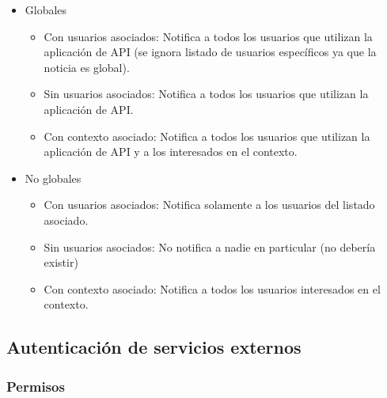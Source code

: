 \begin{itemize}
\item Globales
\begin{itemize}
\item Con usuarios asociados: Notifica a todos los usuarios que utilizan la aplicación de API (se ignora listado de usuarios específicos ya que la noticia es global).
\item Sin usuarios asociados: Notifica a todos los usuarios que utilizan la aplicación de API.
\item Con contexto asociado: Notifica a todos los usuarios que utilizan la aplicación de API y a los interesados en el contexto.
\end{itemize}
\item No globales
\begin{itemize}
\item Con usuarios asociados: Notifica solamente a los usuarios del listado asociado.
\item Sin usuarios asociados: No notifica a nadie en particular (no debería existir)
\item Con contexto asociado: Notifica a todos los usuarios interesados en el contexto.
\end{itemize}
\end{itemize}

\subsection{Autenticación de servicios externos}
\label{autenticacion_servicios_externos}

\subsubsection{Permisos}
\label{autenticacion_permisos}